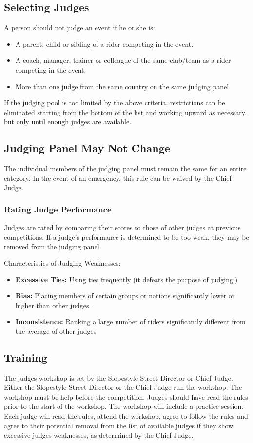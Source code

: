 \subsection{Selecting Judges}
A person should not judge an event if he or she is:
\begin{itemize}
\item A parent, child or sibling of a rider competing in the event.
\item A coach, manager, trainer or colleague of the same club/team as a rider competing in the event.
\item More than one judge from the same country on the same judging panel.
\end{itemize}

If the judging pool is too limited by the above criteria, restrictions can be eliminated starting from the bottom of the list and working upward as necessary, but only until enough judges are available.

\subsection{Judging Panel May Not Change}

The individual members of the judging panel must remain the same for an entire category.
In the event of an emergency, this rule can be waived by the Chief Judge.

\subsubsection{Rating Judge Performance}
Judges are rated by comparing their scores to those of other judges at previous competitions.
If a judge's performance is determined to be too weak, they may be removed from the judging panel.

Characteristics of Judging Weaknesses:
\begin{itemize}
\item \textbf{Excessive Ties:}
Using ties frequently (it defeats the purpose of judging.)
\item \textbf{Bias:}
Placing members of certain groups or nations significantly lower or higher than other judges.
\item\textbf{Inconsistence:}
Ranking a large number of riders significantly different from the average of other judges.
\end{itemize}

\subsection{Training}
The judges workshop is set by the Slopestyle Street Director or Chief Judge.
Either the Slopestyle Street Director or the Chief Judge run the workshop.
The workshop must be help before the competition.
Judges should have read the rules prior to the start of the workshop.
The workshop will include a practice session.
Each judge will read the rules, attend the workshop, agree to follow the rules and agree to their potential removal from the list of available judges if they show excessive judges weaknesses, as determined by the Chief Judge.

